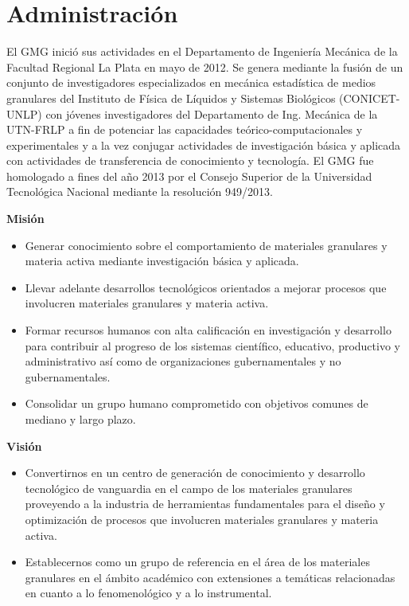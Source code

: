 \documentclass[a4paper,11pt,twoside,final,titlepage,onecolumn,openright]{report}
\begin{document}
\tableofcontents

\chapter{Administración}

El GMG inició sus actividades en el Departamento de Ingeniería Mecánica de la Facultad Regional La Plata en mayo de 2012. Se genera mediante la fusión de un conjunto de investigadores especializados en mecánica estadística de medios granulares del Instituto de Física de Líquidos y Sistemas Biológicos (CONICET-UNLP) con jóvenes investigadores del Departamento de Ing. Mecánica de la UTN-FRLP a fin de potenciar las capacidades teórico-computacionales y experimentales y a la vez conjugar actividades de investigación básica y aplicada con actividades de transferencia de conocimiento y tecnología. El GMG fue homologado a fines del año 2013 por el Consejo Superior de la Universidad Tecnológica Nacional mediante la resolución 949/2013.
		
\vspace{0.5cm}
{\bf Misión}

\begin{itemize}
 \item Generar conocimiento sobre el comportamiento de materiales granulares y materia activa mediante investigación básica y aplicada.
 \item Llevar adelante desarrollos tecnológicos orientados a mejorar procesos que involucren materiales granulares y materia activa.
 \item Formar recursos humanos con alta calificación en investigación y desarrollo para contribuir al progreso de los sistemas científico, educativo, productivo y administrativo así como de organizaciones gubernamentales y no gubernamentales.
 \item Consolidar un grupo humano comprometido con objetivos comunes de mediano y largo plazo.
\end{itemize}

\vspace{0.5cm}
{\bf Visión}

\begin{itemize}
 \item Convertirnos en un centro de generación de conocimiento y desarrollo tecnológico de vanguardia en el campo de los materiales granulares proveyendo a la industria de herramientas fundamentales para el diseño y optimización de procesos que involucren materiales granulares y materia activa.
 \item Establecernos como un grupo de referencia en el área de los materiales granulares en el ámbito académico con extensiones a temáticas relacionadas en cuanto a lo fenomenológico y a lo instrumental.
\end{itemize}
\end{document}
